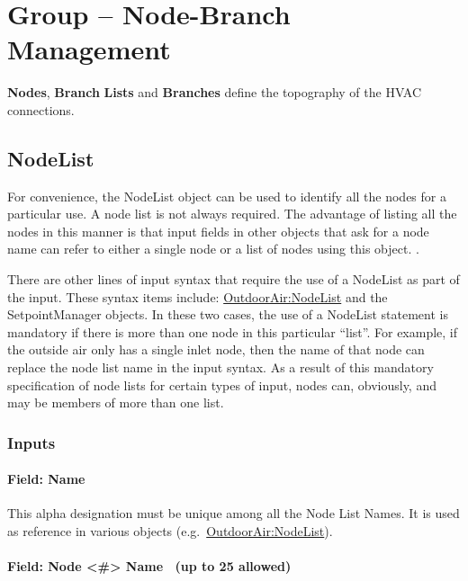 \section{Group -- Node-Branch Management}\label{group-node-branch-management}

\textbf{Nodes}, \textbf{Branch} \textbf{Lists} and \textbf{Branches} define the topography of the HVAC connections.

\subsection{NodeList}\label{nodelist}

For convenience, the NodeList object can be used to identify all the nodes for a particular use. A node list is not always required. The advantage of listing all the nodes in this manner is that input fields in other objects that ask for a node name can refer to either a single node or a list of nodes using this object. .

There are other lines of input syntax that require the use of a NodeList as part of the input. These syntax items include: \hyperref[outdoorairnodelist]{OutdoorAir:NodeList} and the SetpointManager objects. In these two cases, the use of a NodeList statement is mandatory if there is more than one node in this particular ``list''. For example, if the outside air only has a single inlet node, then the name of that node can replace the node list name in the input syntax. As a result of this mandatory specification of node lists for certain types of input, nodes can, obviously, and may be members of more than one list.

\subsubsection{Inputs}\label{inputs-027}

\paragraph{Field: Name}\label{field-name-026}

This alpha designation must be unique among all the Node List Names. It is used as reference in various objects (e.g.~\hyperref[outdoorairnodelist]{OutdoorAir:NodeList}).

\paragraph{Field: Node \textless{}\#\textgreater{} Name ~(up to 25 allowed)}\label{field-node-name-up-to-25-allowed}

